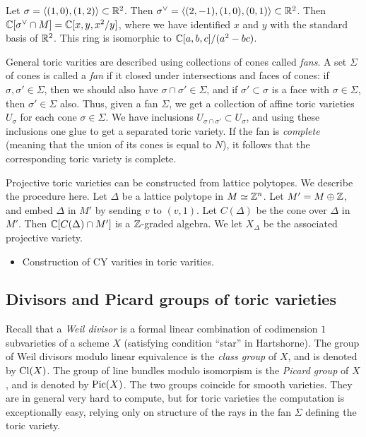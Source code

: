 \begin{example}
Let $\sigma=\langle (1,0), (1,2) \rangle \subset \mathbb{R}^2$. Then $\sigma^\vee = \langle (2,-1),(1,0),(0,1) \rangle \subset \mathbb{R}^2$. Then $\mathbb{C}[\sigma^\vee \cap M] = \mathbb{C}[x,y,x^2/y]$, where we have identified $x$ and $y$ with the standard basis of $\mathbb{R}^2$. This ring is isomorphic to $\mathbb{C}[a,b,c]/(a^2-bc)$.
\end{example}

General toric varities are described using collections of cones called \emph{fans}. A set $\Sigma$ of cones is called a \emph{fan} if it closed under intersections and faces of cones: if $\sigma, \sigma' \in \Sigma$, then we should also have $\sigma \cap \sigma' \in \Sigma$, and if $\sigma' \subset \sigma$ is a face with $\sigma \in \Sigma$, then $\sigma' \in \Sigma$ also. Thus, given a fan $\Sigma$, we get a collection of affine toric varieties $U_\sigma$ for each cone $\sigma \in \Sigma$. We have inclusions $U_{\sigma \cap \sigma'} \subset U_\sigma$, and using these inclusions one glue to get a separated toric variety. If the fan is \emph{complete} (meaning that the union of its cones is equal to $N$), it follows that the corresponding toric variety is complete. 

\begin{example}
\end{example}

Projective toric varieties can be constructed from lattice polytopes. We describe the procedure here. Let $\Delta$ be a lattice polytope in $M \simeq \mathbb{Z}^n$. Let $M' = M \oplus \mathbb{Z}$, and embed $\Delta$ in $M'$ by sending $v$ to $(v,1)$. Let $C(\Delta)$ be the cone over $\Delta$ in $M'$. Then $\mathbb{C}[C(\Delta) \cap M']$ is a $\mathbb{Z}$-graded algebra. We let $X_\Delta$ be the associated projective variety. 

\begin{itemize}
	\item Construction of CY varities in toric varities.
\end{itemize}

\subsection{Divisors and Picard groups of toric varieties}

Recall that a \emph{Weil divisor} is a formal linear combination of codimension $1$ subvarieties of a scheme $X$ (satisfying condition ``star'' in Hartshorne). The group of Weil divisors modulo linear equivalence is the \emph{class group} of $X$, and is denoted by $\operatorname{Cl}(X)$. The group of line bundles modulo isomorpism is the \emph{Picard group} of $X$, and is denoted by $\operatorname{Pic}(X)$. The two groups coincide for smooth varieties. They are in general very hard to compute, but for toric varieties the computation is exceptionally easy, relying only on structure of the rays in the fan $\Sigma$ defining the toric variety.

